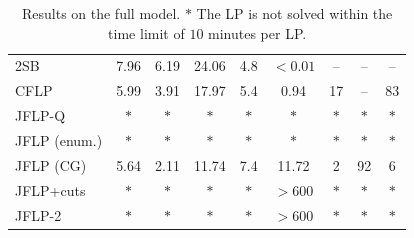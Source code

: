 \documentclass{article}
\begin{document}
\begin{table}[H]
\begin{tabular}{lcccccccc}
2SB & 7.96 & 6.19 & 24.06 & 4.8 & $< 0.01$ & -- & -- & -- \\
CFLP & 5.99 & 3.91 & 17.97 & 5.4 & 0.94 & 17 & -- & 83 \\
JFLP-Q & $\ast$ & $\ast$ & $\ast$ & $\ast$ & $\ast$ & $\ast$ & $\ast$ & $\ast$ \\
JFLP (enum.) & $\ast$ & $\ast$ & $\ast$ & $\ast$ & $\ast$ & $\ast$ & $\ast$ & $\ast$ \\
JFLP (CG) & 5.64 & 2.11 & 11.74 & 7.4 & 11.72 & 2 & 92 & 6 \\
JFLP+cuts & $\ast$ & $\ast$ & $\ast$ & $\ast$ & $> 600$ & $\ast$ & $\ast$ & $\ast$ \\
JFLP-2 & $\ast$ & $\ast$ & $\ast$ & $\ast$ & $> 600$ & $\ast$ & $\ast$ & $\ast$ \\
\bottomrule
\end{tabular}
\caption{Results on the full model. $\ast$ The LP is not solved within the time limit of $10$ minutes per LP.}
\label{tab:results-one-substation}
\end{table}
\end{document}
